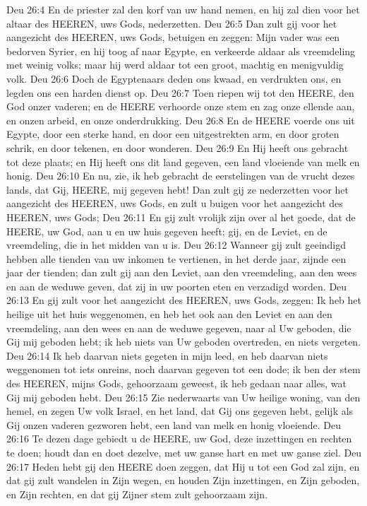 Deu 26:4  En de priester zal den korf van uw hand nemen, en hij zal dien voor het altaar des HEEREN, uws Gods, nederzetten.
Deu 26:5  Dan zult gij voor het aangezicht des HEEREN, uws Gods, betuigen en zeggen: Mijn vader was een bedorven Syrier, en hij toog af naar Egypte, en verkeerde aldaar als vreemdeling met weinig volks; maar hij werd aldaar tot een groot, machtig en menigvuldig volk.
Deu 26:6  Doch de Egyptenaars deden ons kwaad, en verdrukten ons, en legden ons een harden dienst op.
Deu 26:7  Toen riepen wij tot den HEERE, den God onzer vaderen; en de HEERE verhoorde onze stem en zag onze ellende aan, en onzen arbeid, en onze onderdrukking.
Deu 26:8  En de HEERE voerde ons uit Egypte, door een sterke hand, en door een uitgestrekten arm, en door groten schrik, en door tekenen, en door wonderen.
Deu 26:9  En Hij heeft ons gebracht tot deze plaats; en Hij heeft ons dit land gegeven, een land vloeiende van melk en honig.
Deu 26:10  En nu, zie, ik heb gebracht de eerstelingen van de vrucht dezes lands, dat Gij, HEERE, mij gegeven hebt! Dan zult gij ze nederzetten voor het aangezicht des HEEREN, uws Gods, en zult u buigen voor het aangezicht des HEEREN, uws Gods;
Deu 26:11  En gij zult vrolijk zijn over al het goede, dat de HEERE, uw God, aan u en uw huis gegeven heeft; gij, en de Leviet, en de vreemdeling, die in het midden van u is.
Deu 26:12  Wanneer gij zult geeindigd hebben alle tienden van uw inkomen te vertienen, in het derde jaar, zijnde een jaar der tienden; dan zult gij aan den Leviet, aan den vreemdeling, aan den wees en aan de weduwe geven, dat zij in uw poorten eten en verzadigd worden.
Deu 26:13  En gij zult voor het aangezicht des HEEREN, uws Gods, zeggen: Ik heb het heilige uit het huis weggenomen, en heb het ook aan den Leviet en aan den vreemdeling, aan den wees en aan de weduwe gegeven, naar al Uw geboden, die Gij mij geboden hebt; ik heb niets van Uw geboden overtreden, en niets vergeten.
Deu 26:14  Ik heb daarvan niets gegeten in mijn leed, en heb daarvan niets weggenomen tot iets onreins, noch daarvan gegeven tot een dode; ik ben der stem des HEEREN, mijns Gods, gehoorzaam geweest, ik heb gedaan naar alles, wat Gij mij geboden hebt.
Deu 26:15  Zie nederwaarts van Uw heilige woning, van den hemel, en zegen Uw volk Israel, en het land, dat Gij ons gegeven hebt, gelijk als Gij onzen vaderen gezworen hebt, een land van melk en honig vloeiende.
Deu 26:16  Te dezen dage gebiedt u de HEERE, uw God, deze inzettingen en rechten te doen; houdt dan en doet dezelve, met uw ganse hart en met uw ganse ziel.
Deu 26:17  Heden hebt gij den HEERE doen zeggen, dat Hij u tot een God zal zijn, en dat gij zult wandelen in Zijn wegen, en houden Zijn inzettingen, en Zijn geboden, en Zijn rechten, en dat gij Zijner stem zult gehoorzaam zijn.
